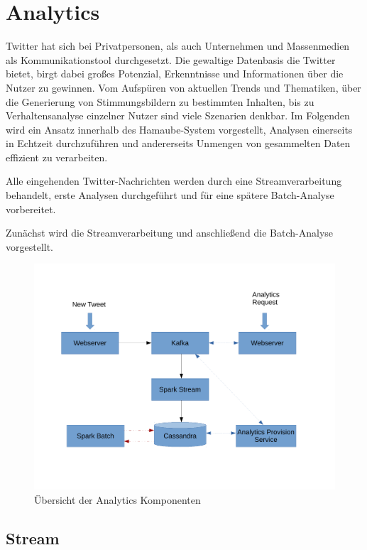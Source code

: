 

\chapter{Analytics}
\label{Analytics}

Twitter hat sich bei Privatpersonen, als auch Unternehmen und Massenmedien als Kommunikationstool durchgesetzt.
Die gewaltige Datenbasis die Twitter bietet, birgt dabei großes Potenzial, Erkenntnisse und Informationen über die Nutzer zu gewinnen.
Vom Aufspüren von aktuellen Trends und Thematiken, über die Generierung von Stimmungsbildern zu bestimmten Inhalten, bis zu Verhaltensanalyse einzelner Nutzer sind viele Szenarien denkbar.
Im Folgenden wird ein Ansatz innerhalb des Hamaube-System vorgestellt, Analysen einerseits in Echtzeit durchzuführen und andererseits Unmengen von gesammelten Daten effizient zu verarbeiten.

Alle eingehenden Twitter-Nachrichten werden durch eine Streamverarbeitung behandelt, erste Analysen durchgeführt und für eine spätere Batch-Analyse vorbereitet.

Zunächst wird die Streamverarbeitung und anschließend die Batch-Analyse vorgestellt.

\begin{figure}[htbp!]
	\centering
	\includegraphics[width=\textwidth]{pics/analytics/archi}
	\caption{Übersicht der Analytics Komponenten}
\end{figure}

\section{Stream}

